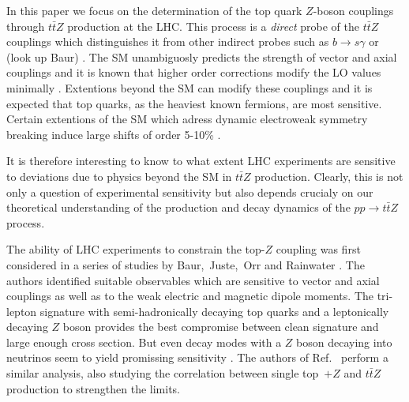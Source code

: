 \documentclass[preprint]{JHEP3} %
\def\ttbZ{t\bar{t}Z}
\begin{document}
In this paper we focus on the determination of the top quark $Z$-boson couplings through $\ttbZ$ production at the LHC. 
This process is a {\it direct} probe of the $\ttbZ$ couplings which distinguishes it from other indirect probes such as $b \to s\gamma$ \cite{} or  (look up Baur) \cite{}. 
The SM unambiguosly predicts the strength of vector and axial couplings and it is known that higher order corrections modify the LO values minimally \cite{}.
Extentions beyond the SM can modify these couplings and it is expected that top quarks, as the heaviest known fermions, are most sensitive. 
Certain extentions of the SM which adress dynamic electroweak symmetry breaking induce large shifts of order 5-10\% \cite{see-inside-LMMP}.
% 

It is therefore interesting to know to what extent LHC experiments are sensitive to deviations due to physics beyond the SM in $\ttbZ$ production.
Clearly, this is not only a question of experimental sensitivity but also depends crucialy on our theoretical understanding of the production and decay dynamics of the $pp\to\ttbZ$ process.

The ability of LHC experiments to constrain the top-$Z$ coupling was first considered in a series of studies by Baur,~Juste,~Orr and Rainwater \cite{Baur:2004uw,Baur:2005wi,one more Baur paper}. 
The authors identified suitable observables which are sensitive to vector and axial couplings as well as to the weak electric and magnetic dipole moments.
The tri-lepton signature with semi-hadronically decaying top quarks and a leptonically decaying $Z$ boson provides the best compromise between
clean signature and large enough cross section. 
But even decay modes with a $Z$ boson decaying into neutrinos seem to yield promissing sensitivity \cite{Baur:2005wi}.
The authors of Ref.~\cite{Berger:2009hi} perform a similar analysis, also studying the correlation between single top~$+Z$ and $\ttbZ$ production to strengthen the limits.
\end{document}
